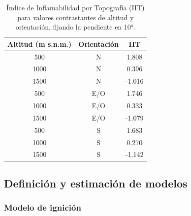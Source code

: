 \begin{table}[h]
    \centering
    \caption[Índice de Inflamabilidad por Topografía para valores contrastantes de altitud y orientación.]{Índice de Inflamabilidad por Topografía (IIT) para valores contrastantes de altitud y orientación, fijando la pendiente en 10°.}
    \label{tab:IIT-values}
    \begin{tabular}{ccc}
    \toprule
    Altitud (m s.n.m.) & Orientación & IIT \\
    \hline
    500 & N & 1.808\\
    1000 & N & 0.396\\
    1500 & N & -1.016\\
    500 & E/O & 1.746\\
    1000 & E/O & 0.333\\
    1500 & E/O & -1.079\\
    500 & S & 1.683\\
    1000 & S & 0.270\\
    1500 & S & -1.142\\
    \bottomrule
    \end{tabular}
\end{table}

\FloatBarrier

\subsection{Definición y estimación de modelos}

\subsubsection{Modelo de ignición}

